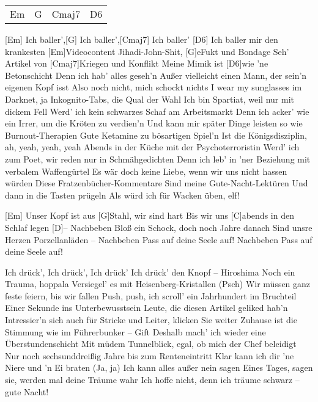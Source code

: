 

\begin{guitar}
	{\footnotesize\begin{tabular}{l|l|l|l}
			Em & G & Cmaj7 & D6
	\end{tabular}}

	[Em] Ich baller',[G] Ich baller',[Cmaj7] Ich baller' [D6]{}
	Ich baller mir den krankesten [Em]Videocontent
	Jihadi-John-Shit, [G]eFukt und Bondage
	Seh' Artikel von [Cmaj7]Kriegen und Konflikt
	Meine Mimik ist [D6]wie 'ne Betonschicht
	Denn ich hab' alles geseh'n
	Außer vielleicht einen Mann, der sein'n eigenen Kopf isst
	Also noch nicht, mich schockt nichts
	I wear my sunglasses im Darknet, ja
	Inkognito-Tabs, die Qual der Wahl
	Ich bin Spartiat, weil nur mit dickem Fell
	Werd' ich kein schwarzes Schaf am Arbeitsmarkt
	Denn ich acker' wie ein Irrer, um die Kröten zu verdien'n
	Und kann mir später Dinge leisten so wie Burnout-Therapien
	Gute Ketamine zu bösartigen Spiel'n
	Ist die Königsdisziplin, ah, yeah, yeah, yeah
	Abends in der Küche mit der Psychoterroristin
	Werd' ich zum Poet, wir reden nur in Schmähgedichten
	Denn ich leb' in 'ner Beziehung mit verbalem Waffengürtel
	Es wär doch keine Liebe, wenn wir uns nicht hassen würden
	Diese Fratzenbücher-Kommentare
	Sind meine Gute-Nacht-Lektüren
	Und dann in die Tasten prügeln
	Als würd ich für Wacken üben, elf!
	
	[Em] Unser Kopf ist aus [G]Stahl, wir sind hart
	Bis wir uns [C]abends in den Schlaf legen [D]{–} Nachbeben
	Bloß ein Schock, doch noch Jahre danach
	Sind unsre Herzen Porzellanläden – Nachbeben
	Pass auf deine Seele auf! Nachbeben
	Pass auf deine Seele auf!
	
	Ich drück', Ich drück', Ich drück'
	Ich drück' den Knopf – Hiroshima
	Noch ein Trauma, hoppala
	Versiegel' es mit Heisenberg-Kristallen (Psch)
	Wir müssen ganz feste feiern, bis wir fallen
	Push, push, ich scroll' ein Jahrhundert im Bruchteil
	Einer Sekunde ins Unterbewusstsein
	Leute, die diesen Artikel geliked hab'n
	Intressier'n sich auch für Stricke und Leiter, klicken Sie weiter
	Zuhause ist die Stimmung wie im Führerbunker – Gift
	Deshalb mach' ich wieder eine Überstundenschicht
	Mit müdem Tunnelblick, egal, ob mich der Chef beleidigt
	Nur noch sechsunddreißig Jahre bis zum Renteneintritt
	Klar kann ich dir 'ne Niere und 'n Ei braten (Ja, ja)
	Ich kann alles außer nein sagen
	Eines Tages, sagen sie, werden mal deine Träume wahr
	Ich hoffe nicht, denn ich träume schwarz – gute Nacht!
	

\end{guitar}
